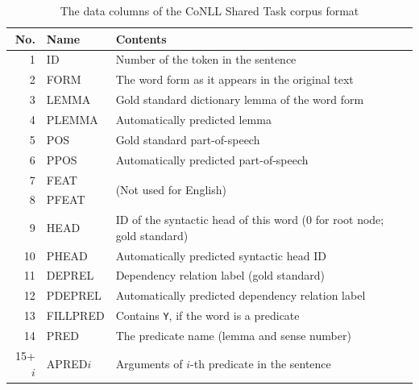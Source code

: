 \documentclass[12pt,notitlepage]{report}
\begin{document}
\begin{table}[htbp]\footnotesize
\caption{The data columns of the CoNLL Shared Task corpus format}\label{tab:st-columns}
\begin{center}
\begin{tabular}{|r|l|l|}\hline
\bf No. & \bf Name & \bf Contents \\\hline
1 & ID & Number of the token in the sentence \\
2 & FORM & The word form as it appears in the original text \\
3 & LEMMA & Gold standard dictionary lemma of the word form \\
4 & PLEMMA & Automatically predicted lemma \\
5 & POS & Gold standard part-of-speech \\
6 & PPOS & Automatically predicted part-of-speech \\
7 & FEAT & \multirow{2}{*}{(Not used for English)} \\
8 & PFEAT & \\
9 & HEAD & ID of the syntactic head of this word (0 for root node; gold standard) \\
10 & PHEAD & Automatically predicted syntactic head ID \\
11 & DEPREL & Dependency relation label (gold standard) \\
12 & PDEPREL & Automatically predicted dependency relation label \\
13 & FILLPRED & Contains \texttt{Y}, if the word is a predicate \\
14 & PRED & The predicate name (lemma and sense number) \\
15+$i$ & APRED$i$ & Arguments of $i$-th predicate in the sentence \\\hline
\end{tabular}
\end{center}
\end{table}
\end{document}
